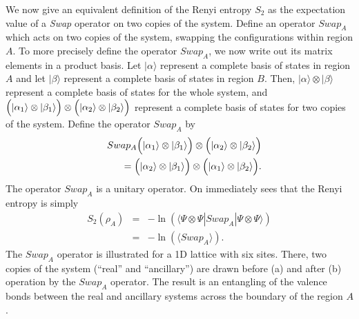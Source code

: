 \documentclass[prl,aps,twocolumn,floatfix,amsmath,amssymb,superscriptaddress,tightenlines]{revtex4}
\begin{document}
We now give an equivalent definition of
the Renyi entropy $S_2$ as the expectation
value of a {\it Swap} operator on two copies of the system.  
Define an
operator $Swap_A$ which acts on two copies of the system, swapping the
configurations within region $A$.  To more precisely define the operator
$Swap_A$, we now write out its matrix elements in a product basis.
Let $|\alpha\rangle$  represent a complete basis of states in region
$A$ and let $|\beta\rangle$ represent a complete basis of states in
region $B$.  Then, $|\alpha\rangle \otimes |\beta\rangle$ represent
a complete basis of states for the whole system, and
$\Bigl( |\alpha_1\rangle \otimes |\beta_1\rangle \Bigr) \otimes
\Bigl( |\alpha_2\rangle \otimes |\beta_2\rangle \Bigr)$
represent a complete basis of states for two copies of the system.
Define the operator $Swap_A$ by
\begin{eqnarray}
&& Swap_A \Bigl( |\alpha_1\rangle \otimes |\beta_1\rangle \Bigr) \otimes
\Bigl( |\alpha_2\rangle \otimes |\beta_2\rangle \Bigr) \nonumber \\ &&=
\Bigl( |\alpha_2\rangle \otimes |\beta_1\rangle \Bigr) \otimes
\Bigl( |\alpha_1\rangle \otimes |\beta_2\rangle \Bigr).
\end{eqnarray}
The operator $Swap_A$ is a unitary operator.
On immediately sees that the Renyi entropy is simply
\begin{eqnarray}
\label{H2fromSwap}
S_2(\rho_A) &=&-\ln(\langle \Psi\otimes \Psi|Swap_A|\Psi\otimes \Psi\rangle) \\
&=&-\ln(\langle Swap_A \rangle).
\end{eqnarray}
The $Swap_A$ operator is illustrated for a 1D lattice with six sites.  There, two copies of the system (``real'' and ``ancillary'') are
drawn before (a) and after (b) operation by the $Swap_A$ operator.  The result is an entangling of the valence bonds between the 
real and ancillary systems across the boundary of the region $A$.
\end{document}
